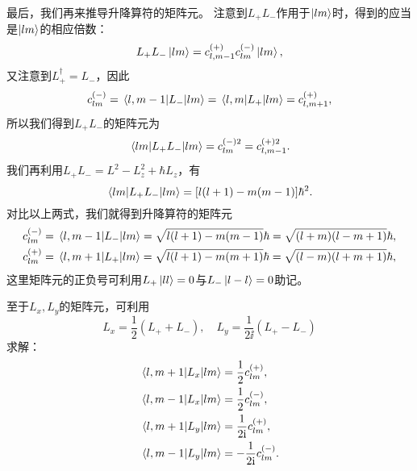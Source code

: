 最后，我们再来推导升降算符的矩阵元。
注意到$L_+ L_-$作用于$\ket{lm}$时，得到的应当是$\ket{lm}$的相应倍数：
\begin{equation}
    L_+ L_- \ket{lm} = c_{l,m-1}^{(+)} c_{lm}^{(-)} \ket{lm},
\end{equation}
又注意到$L_+^\dag=L_-$，因此
\begin{equation}
    c_{lm}^{(-)} = \mel{l,m-1}{L_-}{lm} = \mel{l,m}{L_+}{lm} = c_{l,m+1}^{(+)},
\end{equation}
所以我们得到$L_+ L_-$的矩阵元为
\begin{equation}
    \mel{lm}{L_+ L_-}{lm} = c_{lm}^{(-)2} = c_{l,m-1}^{(+)2}.
\end{equation}
我们再利用$L_+ L_- = L^2 - L_z^2 + \hbar L_z$，有
\begin{equation}
    \mel{lm}{L_+ L_-}{lm} = [l(l+1) - m(m-1)] \hbar^2.
\end{equation}
对比以上两式，我们就得到升降算符的矩阵元
\begin{equation}
\begin{aligned}
    c_{lm}^{(-)} &= \mel{l,m-1}{L_-}{lm} = \sqrt{l(l+1) - m(m-1)} \hbar = \sqrt{(l+m)(l-m+1)} \hbar,\\
    c_{lm}^{(+)} &= \mel{l,m+1}{L_+}{lm} = \sqrt{l(l+1) - m(m+1)} \hbar = \sqrt{(l-m)(l+m+1)} \hbar,
\end{aligned}
\end{equation}
这里矩阵元的正负号可利用$L_+\ket{ll}=0$与$L_-\ket{l-l}=0$助记。

至于$L_x, L_y$的矩阵元，可利用
\begin{equation}
    L_x = \frac12 (L_+ + L_-), \quad L_y = \frac{1}{2\ii} (L_+ - L_-)
\end{equation}
求解：
\begin{equation}
\begin{aligned}
    \mel{l,m+1}{L_x}{lm} &= \frac12 c_{lm}^{(+)},\\
    \mel{l,m-1}{L_x}{lm} &= \frac12 c_{lm}^{(-)},\\
    \mel{l,m+1}{L_y}{lm} &= \frac{1}{2\mathrm{i}} c_{lm}^{(+)},\\
    \mel{l,m-1}{L_y}{lm} &= -\frac{1}{2\mathrm{i}} c_{lm}^{(-)}.
\end{aligned}
\end{equation}

